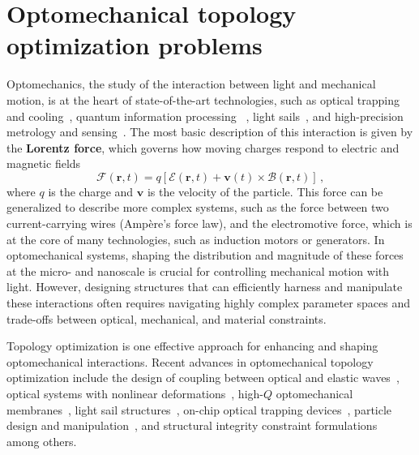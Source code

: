 \chapter{Optomechanical topology optimization problems}\label{chap:om}
Optomechanics, the study of the interaction between light and mechanical motion, is at the heart of state-of-the-art technologies, such as 
optical trapping~\cite{ashkin_acceleration_1970, moffitt_recent_2008} and cooling~\cite{cooling}, quantum information processing~\cite{Andrews_2014, Xi_2025}
, light sails~\cite{lightsail, lightsail1}, and high-precision metrology and sensing~\cite{sensing, weakforce, Li:18, Mason_2019}. The most basic description of this interaction is given by the \textbf{Lorentz force}, which governs how moving charges respond to electric and magnetic fields
\begin{equation}\label{eq:lorentz_f}
 \mathbf{\bm{\mathcal{F}}}(\mathbf{r},t) = q \left[ \bm{\mathcal{E}}(\mathbf{r},t) + \mathbf{v}(t) \times \bm{\mathcal{B}}(\mathbf{r},t) \right]\,,
\end{equation}
where $q$ is the charge and $\mathbf{v}$ is the velocity of the particle. This force can be generalized to describe more complex systems,
such as the force between two current-carrying 
wires (Ampère's force law), and the electromotive force, which is at the core of many technologies, such as induction motors or generators.
In optomechanical systems, shaping the distribution and magnitude of these forces at the micro- and nanoscale is crucial for controlling mechanical motion with light. 
However, designing structures that can efficiently harness and manipulate these interactions often requires navigating highly complex
 parameter spaces and trade-offs between optical, mechanical, and material constraints.

 Topology optimization is one effective approach for enhancing and shaping optomechanical interactions.
Recent advances in optomechanical topology optimization include the design of coupling between optical and elastic
 waves~\cite{photo_topopt}, optical systems with nonlinear deformations~\cite{def_wg}, high-$Q$ optomechanical membranes~\cite{highQ1, fengwen, aragon1},
light sail structures~\cite{lightsail_topopt, lightsail_topopt1},
on-chip optical trapping devices~\cite{ownpub1}, particle design and manipulation~\cite{ownpub2, particle_opt},
and structural integrity constraint formulations~\cite{structural_integrity}
 among others.

